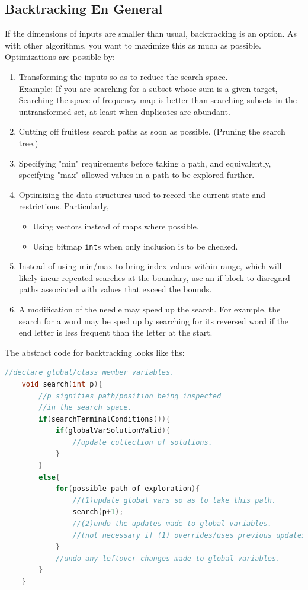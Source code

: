 \documentclass{report}
\begin{document}
\subsection*{Backtracking En General}
If the dimensions of inputs are smaller than usual, backtracking is an option.
As with other algorithms, you want to maximize this as much as possible. Optimizations
are possible by:
\begin{enumerate}
    \item Transforming the inputs so as to reduce the search space.\\
    Example: If you are searching for a subset whose sum is a given target,
    Searching the space of frequency map is better than searching subsets in the
    untransformed set, at least when duplicates are abundant.
    \item Cutting off fruitless search paths as soon as possible. (Pruning the search tree.)
    \item Specifying "min" requirements before taking a path, and equivalently, specifying "max" allowed values in a path to be explored further.
    \item Optimizing the data structures used to record the current state and restrictions. Particularly,
    \begin{itemize}
        \item Using vectors instead of maps where possible.
        \item Using bitmap \texttt{int}s when only inclusion is to be checked.
    \end{itemize}
    \item Instead of using min/max to bring index values within range, which will likely incur repeated
    searches at the boundary, use an if block to disregard paths associated with values
    that exceed the bounds.
    \item A modification of the needle may speed up the search. For example, the search for a word
    may be sped up by searching for its reversed word if the end letter is less frequent than the letter at
    the start.
    
\end{enumerate}
The abstract code for backtracking looks like ths:
\begin{lstlisting}[language=C++]
    //declare global/class member variables.
    void search(int p){
        //p signifies path/position being inspected
        //in the search space.
        if(searchTerminalConditions()){
            if(globalVarSolutionValid){
                //update collection of solutions.
            }
        }
        else{
            for(possible path of exploration){
                //(1)update global vars so as to take this path.
                search(p+1);
                //(2)undo the updates made to global variables.
                //(not necessary if (1) overrides/uses previous updates.)
            }
            //undo any leftover changes made to global variables.
        }
    }
\end{lstlisting}
\end{document}
